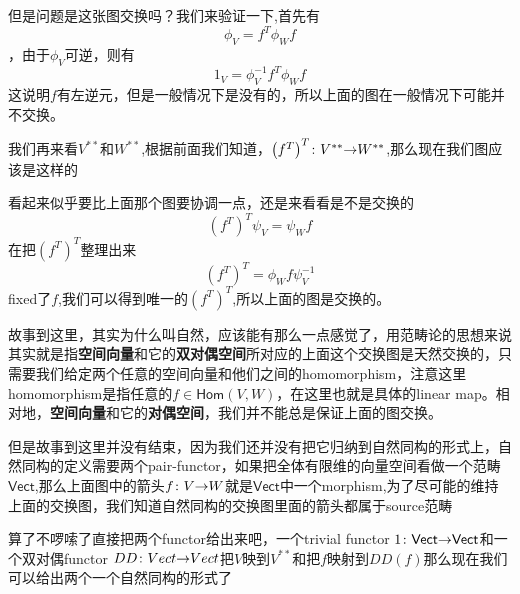 \documentclass[UTF8,11pt,a4paper]{ctexart}%
\begin{document}
但是问题是这张图交换吗？我们来验证一下,首先有\[\phi_{V}=f^{T}\phi_{W}f\]，由于$\phi_{V}$可逆，则有\[1_{V}=\phi_{V}^{-1}f^{T}\phi_{W}f\]这说明$f$有左逆元，但是一般情况下是没有的，所以上面的图在一般情况下可能并不交换。

我们再来看$V^{**}$和$W^{**}$,根据前面我们知道，${{\left(f^{T}\right)}^{T}}\colon{V^{**}}{\to}{W^{**}}$,那么现在我们图应该是这样的
\begin{center}
\end{center}
看起来似乎要比上面那个图要协调一点，还是来看看是不是交换的\[{\left(f^{T}\right)}^{T}\psi_{V}=\psi_Wf\]在把${\left(f^{T}\right)}^{T}$整理出来\[{\left(f^{T}\right)}^{T}=\phi_Wf\psi_V^{-1}\]fixed了$f$,我们可以得到唯一的${\left(f^{T}\right)}^{T}$,所以上面的图是交换的。

故事到这里，其实为什么叫自然，应该能有那么一点感觉了，用范畴论的思想来说其实就是指\textbf{空间向量}和它的\textbf{双对偶空间}所对应的上面这个交换图是天然交换的，只需要我们给定两个任意的空间向量和他们之间的homomorphism，注意这里homomorphism是指任意的$f \in \textsf{Hom}(V,W)$，在这里也就是具体的linear map。相对地，\textbf{空间向量}和它的\textbf{对偶空间}，我们并不能总是保证上面的图交换。

但是故事到这里并没有结束，因为我们还并没有把它归纳到自然同构的形式上，自然同构的定义需要两个pair-functor，如果把全体有限维的向量空间看做一个范畴$\textsf{Vect}$,那么上面图中的箭头${f}\colon{V}{\to}{W}$就是$\textsf{Vect}$中一个morphism,为了尽可能的维持上面的交换图，我们知道自然同构的交换图里面的箭头都属于source范畴

算了不啰嗦了直接把两个functor给出来吧，一个trivial functor ${1}\colon{\textsf{Vect}}{\to}{\textsf{Vect}}$和一个双对偶functor ${DD}\colon{Vect}{\to}{Vect}$把$V$映到$V^{**}$和把$f$映射到$DD(f)$那么现在我们可以给出两个一个自然同构的形式了
\end{document}

